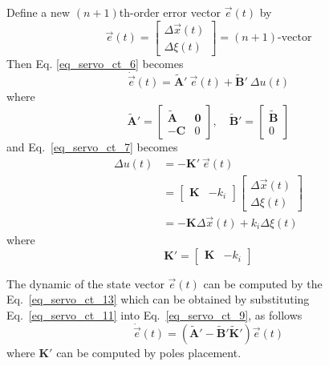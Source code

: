 \documentclass[11pt,a4paper,oneside]{book}
\numberwithin{equation}{section}
\theoremstyle{it}
\theoremstyle{definition}
\begin{document}
Define a new $(n+1)$th-order error vector $\vec{e}(t)$ by 
\begin{equation*}\label{eq_servo_ct_8}
	\vec{e}(t)  = 
	\begin{bmatrix}
		\Delta\vec{x}(t) \\[6pt] \Delta\xi(t)
	\end{bmatrix} = (n+1)\text{-vector}
\end{equation*}
Then Eq. \ref{eq_servo_ct_6} becomes
\begin{equation}\label{eq_servo_ct_9}
	\dot{\vec{e}}(t) = \tilde{\mathbf{A}}'\ \vec{e}(t) + \tilde{\mathbf{B}}'\ 
	\Delta u(t)
\end{equation}
where
\begin{equation}\label{eq_servo_ct_10}
	\tilde{\mathbf{A}}'  = 
	\begin{bmatrix}
		\tilde{\mathbf{A}} & \mathbf{0} \\[6pt]
		-{\mathbf{C}} & 0
	\end{bmatrix}, \quad
	\tilde{\mathbf{B}}'  = 
	\begin{bmatrix}
		\tilde{\mathbf{B}} \\[6pt] 0
	\end{bmatrix}
\end{equation}
and Eq.~\eqref{eq_servo_ct_7} becomes
\begin{equation}\label{eq_servo_ct_11}
	\begin{aligned}
		\Delta u(t) &= -{\mathbf{K}}'\ \vec{e}(t) \\[6pt]
		&= \begin{bmatrix}
			{\mathbf{K}} & -k_i
		\end{bmatrix} \begin{bmatrix}
			\Delta\vec{x}(t) \\[6pt] \Delta\xi(t)
		\end{bmatrix}  \\[6pt]
		&= -{\mathbf{K}}\Delta\vec{x}(t) + k_i\Delta\xi(t)
	\end{aligned}
\end{equation}
where
\begin{equation}\label{eq_servo_ct_12}
	{\mathbf{K}}'= \begin{bmatrix}
		{\mathbf{K}} & -k_i
	\end{bmatrix}
\end{equation}

The dynamic of the state vector $\vec{e}(t)$ can be computed by the 
Eq.~\eqref{eq_servo_ct_13} which can be obtained by substituting 
Eq.~\eqref{eq_servo_ct_11} into Eq.~\eqref{eq_servo_ct_9}, as follows
\begin{equation}\label{eq_servo_ct_13}
	\dot{\vec{e}}(t) = \left(\tilde{\mathbf{A}}' - 
	\tilde{\mathbf{B}}'\tilde{\mathbf{K}}'\right)\vec{e}(t)
\end{equation}
where ${\mathbf{K}}'$ can be computed by poles placement.
\end{document}
